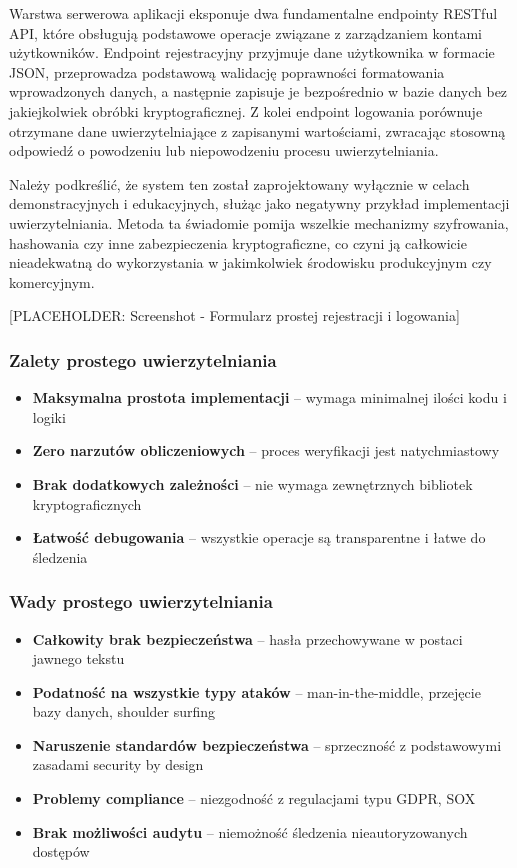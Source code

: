 \documentclass{article}
\begin{document}
Warstwa serwerowa aplikacji eksponuje dwa fundamentalne endpointy RESTful API, które obsługują podstawowe operacje związane z zarządzaniem kontami użytkowników. Endpoint rejestracyjny przyjmuje dane użytkownika w formacie JSON, przeprowadza podstawową walidację poprawności formatowania wprowadzonych danych, a następnie zapisuje je bezpośrednio w bazie danych bez jakiejkolwiek obróbki kryptograficznej. Z kolei endpoint logowania porównuje otrzymane dane uwierzytelniające z zapisanymi wartościami, zwracając stosowną odpowiedź o powodzeniu lub niepowodzeniu procesu uwierzytelniania.

Należy podkreślić, że system ten został zaprojektowany wyłącznie w celach demonstracyjnych i edukacyjnych, służąc jako negatywny przykład implementacji uwierzytelniania. Metoda ta świadomie pomija wszelkie mechanizmy szyfrowania, hashowania czy inne zabezpieczenia kryptograficzne, co czyni ją całkowicie nieadekwatną do wykorzystania w jakimkolwiek środowisku produkcyjnym czy komercyjnym.

[PLACEHOLDER: Screenshot - Formularz prostej rejestracji i logowania]

\subsubsection{Zalety prostego uwierzytelniania}
\begin{itemize}
    \item \textbf{Maksymalna prostota implementacji} – wymaga minimalnej ilości kodu i logiki
    \item \textbf{Zero narzutów obliczeniowych} – proces weryfikacji jest natychmiastowy
    \item \textbf{Brak dodatkowych zależności} – nie wymaga zewnętrznych bibliotek kryptograficznych
    \item \textbf{Łatwość debugowania} – wszystkie operacje są transparentne i łatwe do śledzenia
\end{itemize}

\subsubsection{Wady prostego uwierzytelniania}
\begin{itemize}
    \item \textbf{Całkowity brak bezpieczeństwa} – hasła przechowywane w postaci jawnego tekstu
    \item \textbf{Podatność na wszystkie typy ataków} – man-in-the-middle, przejęcie bazy danych, shoulder surfing
    \item \textbf{Naruszenie standardów bezpieczeństwa} – sprzeczność z podstawowymi zasadami security by design
    \item \textbf{Problemy compliance} – niezgodność z regulacjami typu GDPR, SOX
    \item \textbf{Brak możliwości audytu} – niemożność śledzenia nieautoryzowanych dostępów
\end{itemize}
\end{document}
